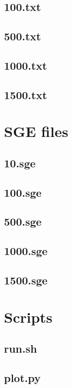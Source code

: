 \documentclass[11pt]{article}
\begin{document}
\subsection{100.txt}

\subsection{500.txt}

\subsection{1000.txt}

\subsection{1500.txt}


\section{SGE files}
\subsection{10.sge}

\subsection{100.sge}

\subsection{500.sge}

\subsection{1000.sge}

\subsection{1500.sge}


\section{Scripts}
\subsection{run.sh}

\subsection{plot.py}


\cite{texbook}



\end{document}
